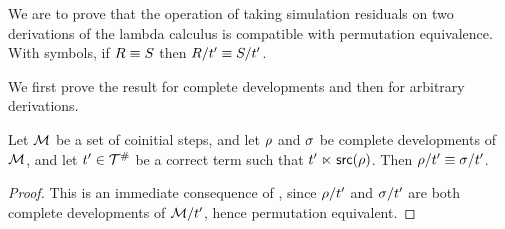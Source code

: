We are to prove that the operation of taking simulation residuals on two
derivations of the lambda calculus is compatible with permutation equivalence.
With symbols, if $R \equiv S$ then $R / t' \equiv S / t'$.

We first prove the result for complete developments and then for arbitrary derivations.


\begin{lemma}
Let $\mathcal{M}$ be a set of coinitial steps,
and let $\rho$ and $\sigma$ be complete developments of $\mathcal{M}$,
and let $t' \in \mathcal{T}^{\mathtt{\#}}$ be a correct term such that $t' \mathrel{\ltimes} \mathsf{src}(\rho)$.
Then $\rho/t' \equiv \sigma/t'$.
\end{lemma}
\begin{proof}
This is an immediate consequence of ,
since $\rho/t'$ and $\sigma/t'$ are both complete developments of $\mathcal{M}/t'$,
hence permutation equivalent.
\end{proof}

